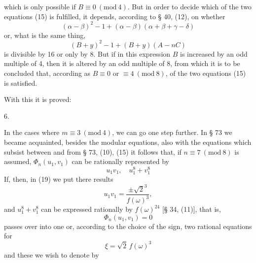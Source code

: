 
which is only possible if $B \equiv 0\ (\mathrm{mod}\ 4)$. But in order to decide which of the two equations (15) is fulfilled, it depends, according to § 40, (12), on whether
\[
(\alpha - \beta)^2 - 1 + (\alpha - \beta)(\alpha + \beta + \gamma - \delta)
\]
or, what is the same thing,
\[
(B+y)^2 - 1 + (B+y)(A - nC)
\]
is divisible by 16 or only by 8. But if in this expression $B$ is increased by an odd multiple of 4, then it is altered by an odd multiple of 8, from which it is to be concluded that, according as $B \equiv 0$ or $\equiv 4\ (\mathrm{mod}\ 8)$,  of the two equations (15) is satisfied. %

With this it is proved:

6. 

In the cases where $m \equiv 3\ (\mathrm{mod}\ 4)$, we can go one step further. In § 73 we became acquainted, besides the  modular equations, also with the equations
which subsist between
and from § 73, (10), (15) it follows that, if $n \equiv 7\ (\mathrm{mod}\ 8)$ is assumed, $\Phi_n(u_1, v_1)$ can be rationally represented by
\[
u_1 v_1, \quad u_1^8 + v_1^8
\]
If, then, in (19) we put
there results
\[
u_1 v_1 = \frac{\pm \sqrt{2}^{3}}{f(\omega)^3},
\]
and $u_1^8 + v_1^8$ can be expressed rationally by $f(\omega)^{24}$ [§ 34, (11)], that is,
\[
\Phi_n(u_1, v_1) = 0
\]
passes over into one or, according to the choice of the sign, two rational equations for
\[
\xi = \sqrt{2}\, f(\omega)^3
\]
and these we wish to denote by
